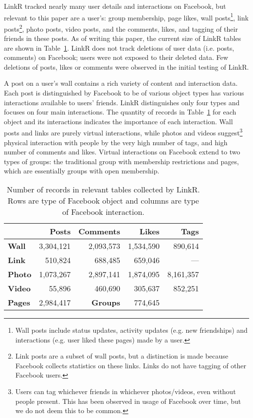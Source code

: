 \documentclass[letterpaper]{article}
\begin{document}
LinkR tracked nearly many user details and interactions on Facebook, but relevant to this paper are a user's: group membership, page likes, wall posts\footnote{Wall posts include status updates, activity updates (e.g. new friendships) and interactions (e.g. user liked these pages) made by a user.}, link posts\footnote{Link posts are a subset of wall posts, but a distinction is made because Facebook collects statistics on these links. Links do not have tagging of other Facebook users.}, photo posts, video posts, and the comments, likes, and tagging of their friends in these posts. As of writing this paper, the current size of LinkR tables are shown in Table~\ref{tab:db}. LinkR does not track deletions of user data (i.e. posts, comments) on Facebook; users were not exposed to their deleted data. Few deletions of posts, likes or comments were observed in the initial testing of LinkR.


A post on a user's wall contains a rich variety of content and interaction data. Each post is distinguished by Facebook to be of various object types has various interactions available to users' friends. LinkR distinguishes only four types and focuses on four main interactions. The quantity of records in Table~\ref{tab:db} for each object and its interactions indicates the importance of each interaction. Wall posts and links are purely virtual interactions, while photos and videos suggest\footnote{Users can tag whichever friends in whichever photos/videos, even without people present. This has been observed in usage of Facebook over time, but we do not deem this to be common.} physical interaction with people by the very high number of tags, and high number of comments and likes. Virtual interactions on Facebook extend to two types of groups: the traditional group with membership restrictions and pages, which are essentially groups with open membership.


\begin{table}
\caption{\small Number of records in relevant tables collected by LinkR. Rows are type of Facebook object and columns are type of Facebook interaction.}
\label{tab:db}
\begin{tabular}{|>{\small}l|>{\small}r|>{\small}r|>{\small}r|>{\small}r|}
\hline
 & \textbf{Posts} & \textbf{Comments} & \textbf{Likes} & \textbf{Tags} \\
\hline
\textbf{Wall} & 3,304,121 & 2,093,573 & 1,534,590 & 890,614 \\
\hline
\textbf{Link} & 510,824 & 688,485 & 659,046 & --- \\
\hline
\textbf{Photo} & 1,073,267 & 2,897,141 & 1,874,095 & 8,161,357 \\
\hline
\textbf{Video} & 55,896 & 460,690 & 305,637 & 852,251 \\
\hline
\hline
\textbf{Pages} & 2,984,417 & \textbf{Groups} & 774,645 & \\
\hline
\end{tabular}
\end{table}
\end{document}
